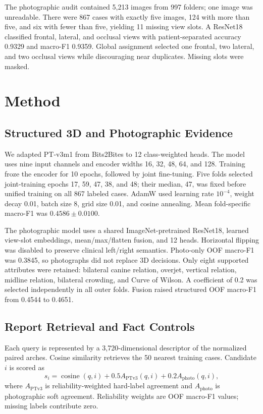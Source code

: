 \documentclass[runningheads]{llncs}
\begin{document}
The photographic audit contained 5,213 images from 997 folders; one image was unreadable. There were 867 cases with exactly five images, 124 with more than five, and six with fewer than five, yielding 11 missing view slots. A ResNet18 \cite{resnet} classified frontal, lateral, and occlusal views with patient-separated accuracy 0.9329 and macro-F1 0.9359. Global assignment selected one frontal, two lateral, and two occlusal views while discouraging near duplicates. Missing slots were masked.

\section{Method}

\subsection{Structured 3D and Photographic Evidence}

We adapted PT-v3m1 \cite{ptv3} from Bits2Bites to 12 class-weighted heads. The model uses nine input channels and encoder widths 16, 32, 48, 64, and 128. Training froze the encoder for 10 epochs, followed by joint fine-tuning. Five folds selected joint-training epochs 17, 59, 47, 38, and 48; their median, 47, was fixed before unified training on all 867 labeled cases. AdamW used learning rate $10^{-4}$, weight decay 0.01, batch size 8, grid size 0.01, and cosine annealing. Mean fold-specific macro-F1 was $0.4586\pm0.0100$.

The photographic model uses a shared ImageNet-pretrained ResNet18, learned view-slot embeddings, mean/max/flatten fusion, and 12 heads. Horizontal flipping was disabled to preserve clinical left/right semantics. Photo-only OOF macro-F1 was 0.3845, so photographs did not replace 3D decisions. Only eight supported attributes were retained: bilateral canine relation, overjet, vertical relation, midline relation, bilateral crowding, and Curve of Wilson. A coefficient of 0.2 was selected independently in all outer folds. Fusion raised structured OOF macro-F1 from 0.4544 to 0.4651.

\subsection{Report Retrieval and Fact Controls}

Each query is represented by a 3,720-dimensional descriptor of the normalized paired arches. Cosine similarity retrieves the 50 nearest training cases. Candidate $i$ is scored as
\begin{equation}
s_i=\operatorname{cosine}(q,i)+0.5A_{\mathrm{PTv3}}(q,i)+0.2A_{\mathrm{photo}}(q,i),
\end{equation}
where $A_{\mathrm{PTv3}}$ is reliability-weighted hard-label agreement and $A_{\mathrm{photo}}$ is photographic soft agreement. Reliability weights are OOF macro-F1 values; missing labels contribute zero.
\end{document}
